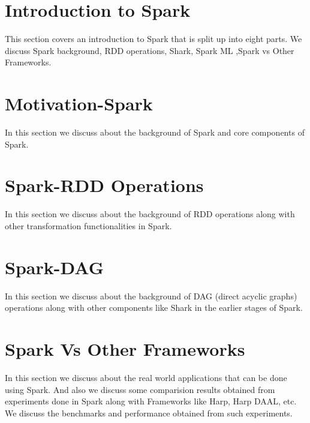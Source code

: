 \section{Introduction to Spark}
\label{c:spark}

This section covers an introduction to Spark that is split up
into eight parts. We discuss Spark background, RDD operations,
Shark, Spark ML ,Spark vs Other Frameworks.

\section{Motivation-Spark}
\label{s:motivation-spark}

In this section we discuss about the background of Spark and
core components of Spark.


\section{Spark-RDD Operations}

In this section we discuss about the background of RDD operations
along with other transformation functionalities in Spark.


\section{Spark-DAG}

In this section we discuss about the background of DAG (direct acyclic
graphs) operations along with other components like Shark in the
earlier stages of Spark.


\section{Spark Vs Other Frameworks}

In this section we discuss about the real world applications that can
be done using Spark.  And also we discuss some comparision results
obtained from experiments done in Spark along with Frameworks like
Harp, Harp DAAL, etc. We discuss the benchmarks and performance
obtained from such experiments.



